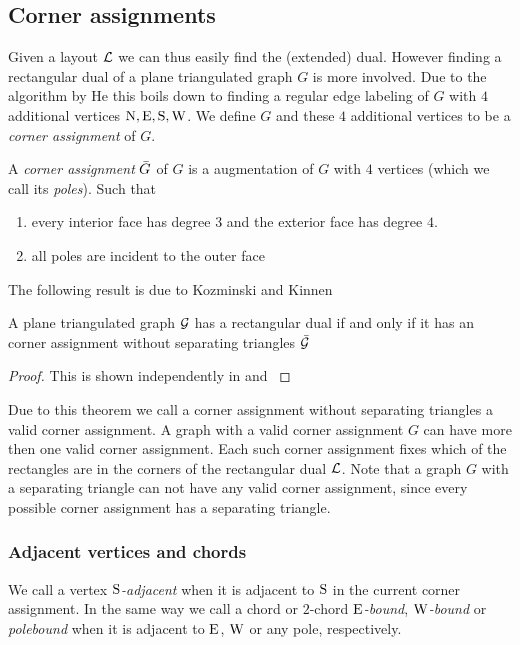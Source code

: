 \subsection{Corner assignments}

  Given a layout $\mathcal{L}$ we can thus easily find the (extended) dual. However finding a rectangular dual of a plane triangulated graph $G$ is more involved. Due to the algorithm by He \cite{He1993} this boils down to finding a regular edge labeling of $G$ with $4$ additional vertices $\mathrm{N}, \mathrm{E}, \mathrm{S}, \mathrm{W}$. We define $G$ and these $4$ additional vertices to be a \emph{corner assignment} of $G$.

  \begin{defi}
    A \emph{corner assignment} $\bar{G}$ of $G$ is a augmentation of $G$ with $4$ vertices (which we call its \emph{poles}). Such that
    \begin{enumerate}
    \item every interior face has degree $3$ and the exterior face has degree $4$.
    \item all poles are incident to the outer face
    \end{enumerate}
  \end{defi}

  The following result is due to Kozminski and Kinnen

  \begin{thrm}
    \label{th:rect:exsitenceREctangularDual}
    A plane triangulated graph $\mathcal{G}$ has a rectangular dual if and only if it has an corner assignment without separating triangles $\bar{\mathcal{G}}$
  \end{thrm}

  \begin{proof}
    This is shown independently in \cite{Kozminski1984} and  \cite{Ungar1953}
  \end{proof}

  Due to this theorem we call a corner assignment without separating triangles a valid corner assignment.
  A graph with a valid corner assignment $G$ can have more then one valid corner assignment. Each such corner assignment fixes which of the rectangles are in the corners of the rectangular dual $\mathcal{L}$.
  Note that a graph $G$ with a separating triangle can not have any valid corner assignment, since every possible corner assignment has a separating triangle.

  \subsubsection{Adjacent vertices and chords}
  We call a vertex \emph{$\mathrm{S}$-adjacent} when it is adjacent to $\mathrm{S}$ in the current corner assignment. In the same way we call a chord or $2$-chord \emph{$\mathrm{E}$-bound}, \emph{$\mathrm{W}$-bound} or \emph{polebound} when it is adjacent to $\mathrm{E}$, $\mathrm{W}$ or any pole,  respectively.

